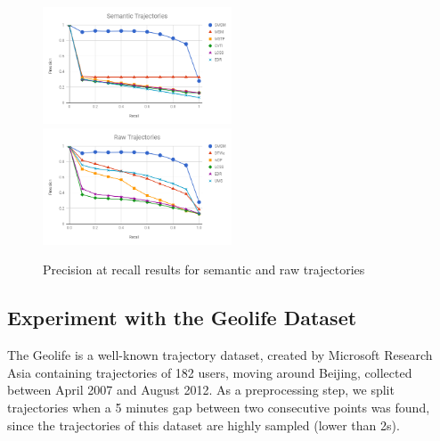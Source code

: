 \begin{figure}[ht!]
\centering
\centerline{
\includegraphics[width=0.5\textwidth]{Images/new_P_R-chart_San_Francisco.png}
\includegraphics[width=0.5\textwidth]{Images/new_P_R-chart_San_Francisco-raw.png}
}
\caption{ Precision at recall results for semantic and raw trajectories}
\label{fig:new_sanfrancisco_precision_recall}
\end{figure}


\subsection{Experiment with the Geolife Dataset}\label{sec:geolife}

The Geolife is a well-known trajectory dataset, created by Microsoft Research Asia \cite{zheng2009mining} containing trajectories of 182 users, moving around Beijing, collected between April 2007 and August 2012. As a preprocessing step, we split trajectories when a 5 minutes gap between two consecutive points was found, since the trajectories of this dataset are highly sampled (lower than 2s).

